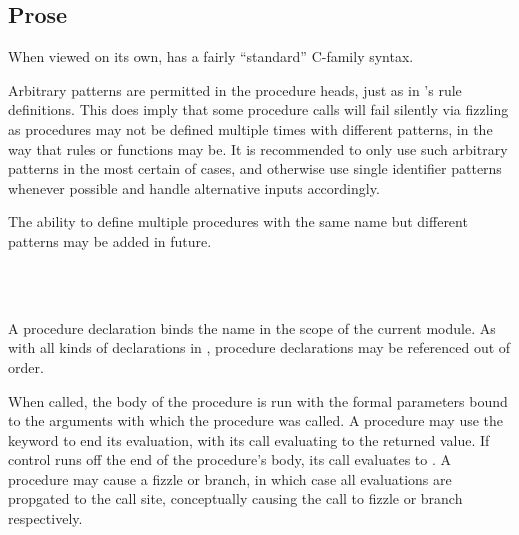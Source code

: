 \subsection{Prose}

When viewed on its own, \Prose{} has a fairly ``standard'' C-family syntax.

Arbitrary patterns are permitted in the procedure heads, just as in \Law{}'s
rule definitions. This does imply that some procedure calls will fail silently
via fizzling as procedures may not be defined multiple times with different
patterns, in the way that rules or functions may be. It is recommended to only
use such arbitrary patterns in the most certain of cases, and otherwise use
single identifier patterns whenever possible and handle alternative inputs
accordingly.

The ability to define multiple procedures with the same name but different
patterns may be added in future.

\begin{bnf*}
     \\
     \\
\end{bnf*}

\noindent A procedure declaration binds the name in the scope of the current module.
As with all kinds of declarations in \Trilogy{}, procedure declarations may be
referenced out of order.

When called, the body of the procedure is run with the formal parameters bound to
the arguments with which the procedure was called. A procedure may use the 
keyword to end its evaluation, with its call evaluating to the returned value.
If control runs off the end of the procedure's body, its call evaluates to .
A procedure may cause a fizzle or branch, in which case all evaluations are propgated
to the call site, conceptually causing the call to fizzle or branch respectively.

\begin{prooftree}
\end{prooftree}

